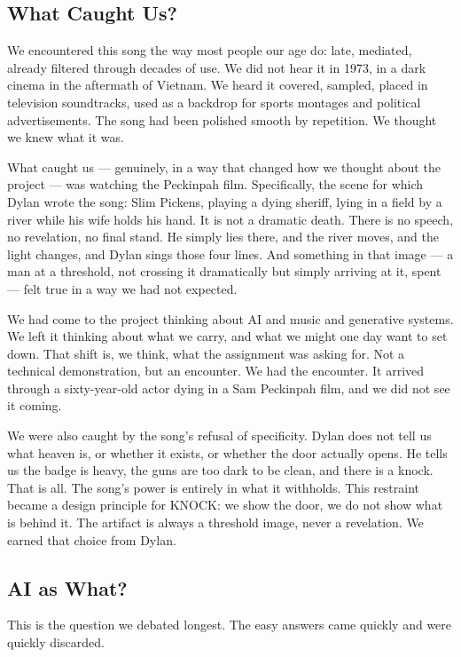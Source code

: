 \documentclass[12pt, a4paper]{article}
\begin{document}
\subsection{What Caught Us?}

We encountered this song the way most people our age do: late, mediated, already
filtered through decades of use. We did not hear it in 1973, in a dark cinema in the
aftermath of Vietnam. We heard it covered, sampled, placed in television soundtracks,
used as a backdrop for sports montages and political advertisements. The song had been
polished smooth by repetition. We thought we knew what it was.

What caught us --- genuinely, in a way that changed how we thought about the project
--- was watching the Peckinpah film. Specifically, the scene for which Dylan wrote
the song: Slim Pickens, playing a dying sheriff, lying in a field by a river while
his wife holds his hand. It is not a dramatic death. There is no speech, no
revelation, no final stand. He simply lies there, and the river moves, and the light
changes, and Dylan sings those four lines. And something in that image --- a man at a
threshold, not crossing it dramatically but simply arriving at it, spent --- felt
true in a way we had not expected.

We had come to the project thinking about AI and music and generative systems. We
left it thinking about what we carry, and what we might one day want to set down.
That shift is, we think, what the assignment was asking for. Not a technical
demonstration, but an encounter. We had the encounter. It arrived through a
sixty-year-old actor dying in a Sam Peckinpah film, and we did not see it coming.

We were also caught by the song's refusal of specificity. Dylan does not tell us what
heaven is, or whether it exists, or whether the door actually opens. He tells us the
badge is heavy, the guns are too dark to be clean, and there is a knock. That is all.
The song's power is entirely in what it withholds. This restraint became a design
principle for KNOCK: we show the door, we do not show what is behind it. The artifact
is always a threshold image, never a revelation. We earned that choice from Dylan.

\subsection{AI as What?}

This is the question we debated longest. The easy answers came quickly and were
quickly discarded.
\end{document}
